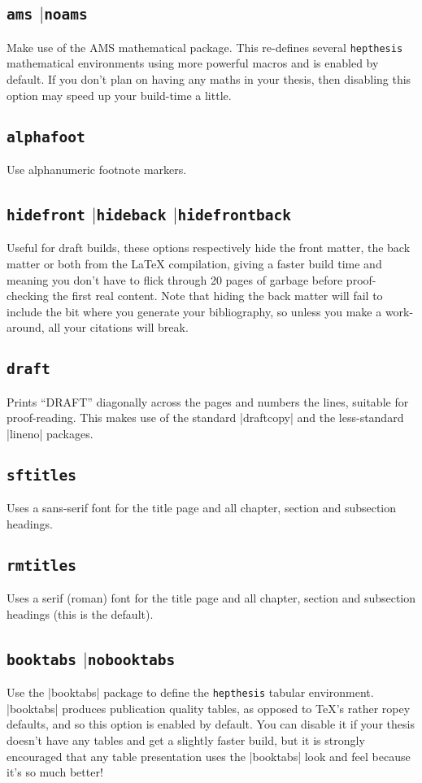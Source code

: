 \documentclass[12pt]{scrartcl}
\newcommand{\hepthesis}{\texttt{hepthesis}\xspace}
\newcommand{\Or}{\texorpdfstring{\ensuremath{\vert}\xspace}{or}}
\newcommand{\texopt}[1]{\texorpdfstring{\texttt{#1}}{#1}}
\begin{document}
\subsection{\texopt{ams} \Or \texopt{noams}}
Make use of the AMS mathematical package. This re-defines several \hepthesis
mathematical environments using more powerful macros and is enabled by default.
If you don't plan on having any maths in your thesis, then disabling this option
may speed up your build-time a little.

\subsection{\texopt{alphafoot}}
Use alphanumeric footnote markers.

\subsection{\texopt{hidefront} \Or \texopt{hideback} \Or \texopt{hidefrontback}}
Useful for draft builds, these options respectively hide the front matter, the
back matter or both from the \LaTeX{} compilation, giving a faster build time
and meaning you don't have to flick through 20 pages of garbage before
proof-checking the first real content. Note that hiding the back matter will
fail to include the bit where you generate your bibliography, so unless you make
a work-around, all your citations will break.

\subsection{\texopt{draft}}
Prints ``DRAFT'' diagonally across the pages and numbers the lines, suitable for
proof-reading. This makes use of the standard |draftcopy| and the less-standard
|lineno| packages.

\subsection{\texopt{sftitles}}
Uses a sans-serif font for the title page and all chapter, section and
subsection headings.

\subsection{\texopt{rmtitles}}
Uses a serif (roman) font for the title page and all chapter, section and
subsection headings (this is the default).

\subsection{\texopt{booktabs} \Or \texopt{nobooktabs}}
Use the |booktabs| package to define the \hepthesis tabular environment.
|booktabs| produces publication quality tables, as opposed to \TeX's rather
ropey defaults, and so this option is enabled by default. You can disable it if
your thesis doesn't have any tables and get a slightly faster build, but it is
strongly encouraged that any table presentation uses the |booktabs| look and
feel because it's so much better!
\end{document}
